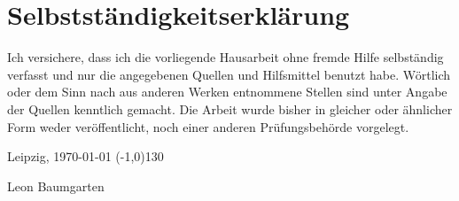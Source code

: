 \documentclass[12pt]{scrreprt}
\begin{document}
	
	\newpage
	\chapter{Selbstständigkeitserklärung}
	Ich versichere, dass ich die vorliegende Hausarbeit ohne
	fremde Hilfe selbständig verfasst und nur die angegebenen Quellen und Hilfsmittel
	benutzt habe. Wörtlich oder dem Sinn nach aus anderen Werken entnommene Stellen
	sind unter Angabe der Quellen kenntlich gemacht. Die Arbeit wurde bisher in gleicher
	oder ähnlicher Form weder veröffentlicht, noch einer anderen Prüfungsbehörde
	vorgelegt. 
	\vspace{16cm}
	
	Leipzig, \today \hspace{6cm} \line(-1,0){130}
	\begin{center}
		\hspace{5mm} {\footnotesize Leon Baumgarten}
	\end{center}
	
\end{document}
